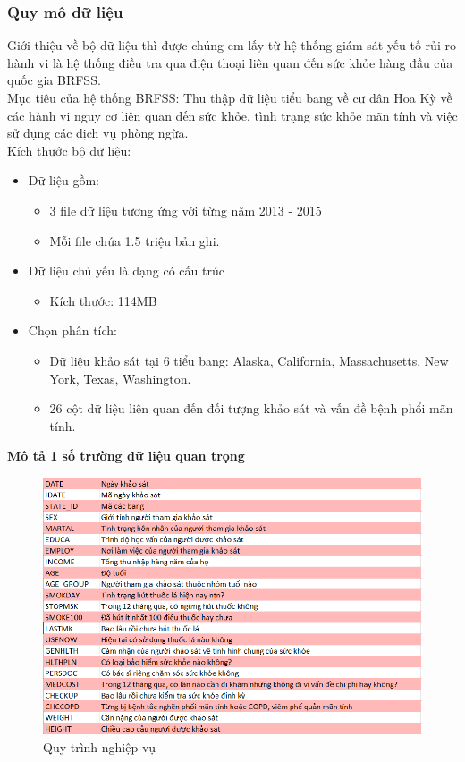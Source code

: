 \subsubsection{Quy mô dữ liệu}
Giới thiệu về bộ dữ liệu thì được chúng em lấy từ hệ thống giám sát yếu tố rủi ro hành vi là hệ thống điều tra qua điện thoại liên quan đến sức khỏe hàng đầu của quốc gia BRFSS.\\
Mục tiêu của hệ thống BRFSS: Thu thập dữ liệu tiểu bang về cư dân Hoa Kỳ về các hành vi nguy cơ liên quan đến sức khỏe, tình trạng sức khỏe mãn tính và việc sử dụng các dịch vụ phòng ngừa.\\
Kích thước bộ dữ liệu:
\begin{itemize}[label=$-$]
\newpage
    \item Dữ liệu gồm:
    \begin{itemize}[label=$+$]
        \item 3 file dữ liệu tương ứng với từng năm 2013 - 2015        \item Mỗi file chứa 1.5 triệu bản ghi.
    \end{itemize}
    \item Dữ liệu chủ yếu là dạng có cấu trúc
    \begin{itemize}
    \item Kích thước: 114MB
    \end{itemize}
    \item Chọn phân tích:
    \begin{itemize}[label=$+$]
        \item Dữ liệu khảo sát tại 6 tiểu bang: Alaska, California, Massachusetts, New York, Texas, Washington.
        \item 26 cột dữ liệu liên quan đến đối tượng khảo sát và vấn đề bệnh phổi mãn tính.
    \end{itemize}
\end{itemize}
\textbf{Mô tả 1 số trường dữ liệu quan trọng}
\begin{center}
            \begin{figure}[!h]
                \centering
                \includegraphics[scale = 1]{figures/Duyen/Mô tả 1 số trường dữ liệu quan trọng.PNG}
              \caption{Quy trình nghiệp vụ}
            \end{figure}
\end{center}
